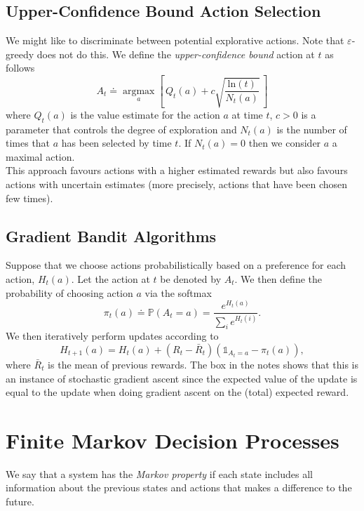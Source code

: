 \documentclass[a4paper, oneside, 11pt]{article}
\newcommand\argmax{\operatorname*{argmax}}
\renewcommand\P{\mathbb{P}}
\begin{document}
\subsection{Upper-Confidence Bound Action Selection}
We might like to discriminate between potential explorative actions. Note that $\varepsilon$-greedy does not do this. We define the \emph{upper-confidence bound} action at $t$ as follows
\begin{equation}
    A_t \doteq \argmax_{a}\left[ \, Q_t(a)+ c \sqrt{\frac{\mathrm{ln}(t)}{N_t(a)}} \, \right]
\end{equation}
where $Q_t(a)$ is the value estimate for the action $a$ at time $t$, $c > 0$ is a parameter that controls the degree of exploration and $N_t(a)$ is the number of times that $a$ has been selected by time $t$. If $N_t(a) = 0$ then we consider $a$ a maximal action.\\

This approach favours actions with a higher estimated rewards but also favours actions with uncertain estimates (more precisely, actions that have been chosen few times).


\subsection{Gradient Bandit Algorithms}
Suppose that we choose actions probabilistically based on a preference for each action, $H_t(a)$. Let the action at $t$ be denoted by $A_t$. We then define the probability of choosing action $a$ via the softmax
\begin{equation}
    \pi_t(a) \doteq \P{}(A_t = a) = \frac{e^{H_t(a)}}{\sum_i e^{H_t(i)}}.
\end{equation}
We then iteratively perform updates according to 
\begin{equation}
    H_{t+1}(a) = H_t(a) + (R_t - \bar{R}_t)(\mathds{1}_{A_t = a} - \pi_t(a)),
\end{equation}
where $\bar{R}_t$ is the mean of previous rewards. The box in the notes shows that this is an instance of stochastic gradient ascent since the expected value of the update is equal to the update when doing gradient ascent on the (total) expected reward.


\section{Finite Markov Decision Processes}
We say that a system has the \emph{Markov property} if each state includes all information about the previous states and actions that makes a difference to the future.\\
\end{document}

